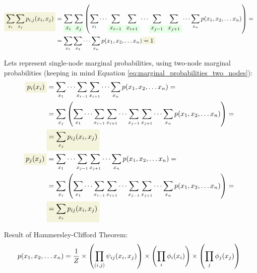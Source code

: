 \documentclass[fleqn,leqno]{article}
\newcommand{\highlight}[1]{\colorbox{green!10}{$\displaystyle#1$}}
\newcommand{\highlightred}[1]{\colorbox{olive!10}{$\displaystyle#1$}}
\begin{document}
\begin{equation} \label{eq:sum_over_states_of_two_node_marginal_probabilities}
\begin{split}
\highlightred{ \sum_{x_i} \sum_{x_j} p_{i,j}(x_i, x_j) } & = \sum_{ \highlight{ x_i } } \sum_{ \highlight{ x_j } } \left( \sum_{x_1} \cdots \sum_{ \highlight{ x_{i - 1} } } \sum_{ \highlight{ x_{i + 1} } } \cdots \sum_{ \highlight{ x_{j - 1} } } \sum_{ \highlight{ x_{j + 1} } } \cdots \sum_{x_n} p(x_1, x_2, \dots x_n) \right) = \\
                                                           & = \sum_{x_1} \sum_{x_2} \cdots \sum_{x_n}  p(x_1, x_2, \dots x_n) \highlightred{ = 1 } \\
\end{split}
\end{equation}

Lets represent single-node marginal probabilities, using two-node marginal probabilities (keeping in mind Equation \eqref{eq:marginal_probabilities_two_nodes}):
\begin{equation} \label{eq:one_node_marginal_probabilities_from_two_node_marginal_probabilities}
\begin{split}
\highlightred{ p_i(x_i) } & = \sum_{x_1} \cdots \sum_{ x_{i - 1} } \sum_{ x_{i + 1} } \cdots \sum_{x_n} p(x_1, x_2, \dots x_n) = \\
             & = \sum_{x_j} \left( \sum_{x_1} \cdots \sum_{ x_{i - 1} } \sum_{ x_{i + 1} } \cdots \sum_{ x_{j - 1} } \sum_{ x_{j + 1} } \cdots \sum_{x_n} p(x_1, x_2, \dots x_n) \right) = \\
             & \highlightred{ = \sum_{x_j} p_{ij}(x_i, x_j) } \\
\highlightred{ p_j(x_j) } & = \sum_{x_1} \cdots \sum_{ x_{j - 1} } \sum_{ x_{j + 1} } \cdots \sum_{x_n} p(x_1, x_2, \dots x_n) = \\
             & = \sum_{x_i} \left( \sum_{x_1} \cdots \sum_{ x_{i - 1} } \sum_{ x_{i + 1} } \cdots \sum_{ x_{j - 1} } \sum_{ x_{j + 1} } \cdots \sum_{x_n} p(x_1, x_2, \dots x_n) \right) = \\
             & \highlightred{ = \sum_{x_i} p_{ij}(x_i, x_j) }
\end{split}
\end{equation}

Result of Hammersley-Clifford Theorem:
\begin{equation} \label{eq:hammersley_clifford_probability}
p(x_1, x_2, \dots x_n) = {1 \over Z} \times \left( \prod_{(i, j)} \psi_{ij}(x_i, x_j) \right) \times \left( \prod_{i} \phi_i(x_i) \right) \times \left( \prod_{j} \phi_j(x_j) \right)
\end{equation}
\end{document}
